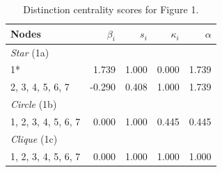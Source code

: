\begin{table}
\footnotesize
\centering
\caption{\label{tab:fig1-star}Distinction centrality scores for Figure 1.}
\centering
\begin{tabular}[t]{lrrrr}
Nodes & $\beta_i$ & $s_i$ & $\kappa_i$ & $\alpha$\\
\toprule
\midrule
\textit{Star} (1a)\\
1* & 1.739 & 1.000 & 0.000 & 1.739\\
2, 3, 4, 5, 6, 7 & -0.290 & 0.408 & 1.000 & 1.739\\
\midrule
\midrule
\textit{Circle} (1b)\\
1, 2, 3, 4, 5, 6, 7 & 0.000 & 1.000 & 0.445 & 0.445\\
\midrule
\midrule
\textit{Clique} (1c)\\
1, 2, 3, 4, 5, 6, 7 & 0.000 & 1.000 & 1.000 & 1.000\\
\bottomrule
\bottomrule
\end{tabular}
\end{table}

